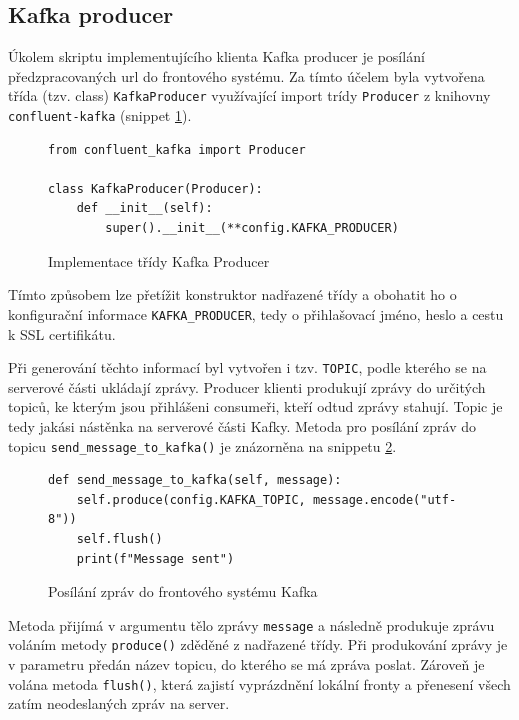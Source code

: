 \documentclass[thesis=M,czech,hidelinks]{FITthesis}[2013/05/06]
\begin{document}
\subsection{Kafka producer} \label{sec:kafkaproducer}
Úkolem skriptu implementujícího klienta Kafka producer je posílání předzpracovaných url do frontového systému. Za tímto účelem byla vytvořena třída (tzv. class) \texttt{KafkaProducer} využívající import trídy \texttt{Producer} z knihovny \texttt{confluent-kafka} (snippet \ref{snip:kafkaproducer}).
\begin{figure}[h]               
	\begin{verbatim}
from confluent_kafka import Producer

class KafkaProducer(Producer):
    def __init__(self):
        super().__init__(**config.KAFKA_PRODUCER)
	\end{verbatim}      
	\caption{Implementace třídy Kafka Producer}
	\label{snip:kafkaproducer}
\end{figure}
Tímto způsobem lze přetížit konstruktor nadřazené třídy a obohatit ho o konfigurační informace \texttt{KAFKA_PRODUCER}, tedy o přihlašovací jméno, heslo a cestu k SSL certifikátu.

Při generování těchto informací byl vytvořen i tzv. \texttt{TOPIC}, podle kterého se na serverové části ukládají zprávy. Producer klienti produkují zprávy do určitých topiců, ke kterým jsou přihlášeni consumeři, kteří odtud zprávy stahují. Topic je tedy jakási nástěnka na serverové části Kafky. Metoda pro posílání zpráv do topicu \texttt{send_message_to_kafka()} je znázorněna na snippetu \ref{snip:kafkasend}.
\begin{figure}[h]               
	\begin{verbatim}
def send_message_to_kafka(self, message):
    self.produce(config.KAFKA_TOPIC, message.encode("utf-8"))
    self.flush()
    print(f"Message sent")
	\end{verbatim}      
	\caption{Posílání zpráv do frontového systému Kafka}
	\label{snip:kafkasend}
\end{figure}
Metoda přijímá v argumentu tělo zprávy \texttt{message} a následně produkuje zprávu voláním metody \texttt{produce()} zděděné z nadřazené třídy. Při produkování zprávy je v parametru předán název topicu, do kterého se má zpráva poslat. Zároveň je volána metoda \texttt{flush()}, která zajistí vyprázdnění lokální fronty a přenesení všech zatím neodeslaných zpráv na server.
\end{document}
